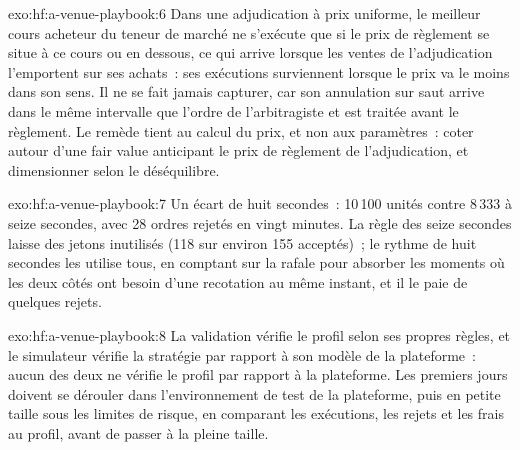 \begin{solution}{exo:hf:a-venue-playbook:6}
Dans une adjudication à prix uniforme, le meilleur cours acheteur du teneur de marché ne s'exécute que si le prix de règlement se situe à ce cours ou en dessous, ce qui arrive lorsque les ventes
de l'adjudication l'emportent sur ses achats~: ses exécutions surviennent lorsque le prix va le moins dans son sens. Il ne se fait jamais capturer, car son annulation sur saut arrive dans le même intervalle
que l'ordre de l'arbitragiste et est traitée avant le règlement. Le remède tient au calcul du prix, et non aux paramètres~: coter autour d'une fair value
anticipant le prix de règlement de l'adjudication, et dimensionner selon le déséquilibre.
\end{solution}

\begin{solution}{exo:hf:a-venue-playbook:7}
Un écart de huit secondes~: 10\,100 unités contre 8\,333 à seize secondes, avec 28 ordres rejetés en vingt minutes. La règle des seize secondes laisse
des jetons inutilisés (118 sur environ 155 acceptés)~; le rythme de huit secondes les utilise tous, en comptant sur la rafale pour absorber les moments où les deux côtés
ont besoin d'une recotation au même instant, et il le paie de quelques rejets.
\end{solution}

\begin{solution}{exo:hf:a-venue-playbook:8}
La validation vérifie le profil selon ses propres règles, et le simulateur vérifie la stratégie par rapport à son modèle de la plateforme~: aucun des deux
ne vérifie le profil par rapport à la plateforme. Les premiers jours doivent se dérouler dans l'environnement de test de la plateforme, puis en petite taille sous les limites de risque, en comparant
les exécutions, les rejets et les frais au profil, avant de passer à la pleine taille.
\end{solution}

